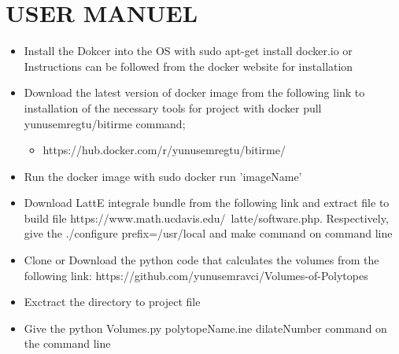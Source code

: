 \documentclass[12pt,twoside]{article}
\begin{document}
\section{USER MANUEL}
\begin{itemize}
	\item Install the Dokcer into the OS with sudo apt-get install docker.io or
Instructions can be followed from the docker website for installation
	\item  Download the latest version of docker image from the following link to
installation of the necessary tools for project with docker pull
yunusemregtu/bitirme command;
	\begin{itemize}
		\item https://hub.docker.com/r/yunusemregtu/bitirme/
	\end{itemize}	 
	\item Run the docker image with sudo docker run 'imageName'
	\item Download LattE integrale bundle from the following link and extract file to
build file https://www.math.ucdavis.edu/~latte/software.php. Respectively,
give the ./configure prefix=/usr/local and make command on command
line
	\item Clone or Download the python code that calculates the volumes from the
following link: https://github.com/yunusemravci/Volumes-of-Polytopes
	\item Exctract the directory to project file
	\item Give the python Volumes.py polytopeName.ine dilateNumber command
on the command line
\end{itemize}
 \newpage
\end{document}
